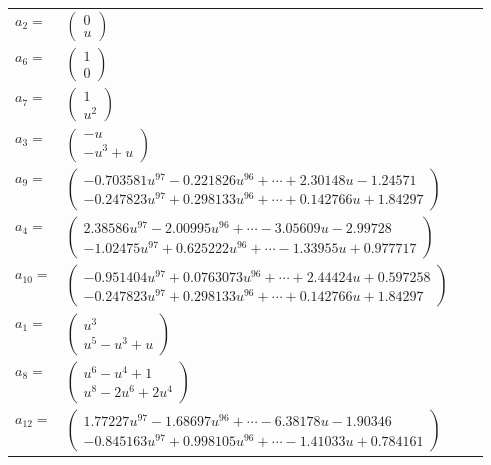 \documentclass[1p]{elsarticle_modified}
\theoremstyle{definition}
\begin{document}
\begin{tabular}{m{7pt} m{180pt} m{7pt} m{180pt} }
\flushright $a_{2}=$&$\begin{pmatrix}0\\u\end{pmatrix}$ \\
\flushright $a_{6}=$&$\begin{pmatrix}1\\0\end{pmatrix}$ \\
\flushright $a_{7}=$&$\begin{pmatrix}1\\u^2\end{pmatrix}$ \\
\flushright $a_{3}=$&$\begin{pmatrix}- u\\- u^3+u\end{pmatrix}$ \\
\flushright $a_{9}=$&$\begin{pmatrix}-0.703581 u^{97}-0.221826 u^{96}+\cdots+2.30148 u-1.24571\\-0.247823 u^{97}+0.298133 u^{96}+\cdots+0.142766 u+1.84297\end{pmatrix}$ \\
\flushright $a_{4}=$&$\begin{pmatrix}2.38586 u^{97}-2.00995 u^{96}+\cdots-3.05609 u-2.99728\\-1.02475 u^{97}+0.625222 u^{96}+\cdots-1.33955 u+0.977717\end{pmatrix}$ \\
\flushright $a_{10}=$&$\begin{pmatrix}-0.951404 u^{97}+0.0763073 u^{96}+\cdots+2.44424 u+0.597258\\-0.247823 u^{97}+0.298133 u^{96}+\cdots+0.142766 u+1.84297\end{pmatrix}$ \\
\flushright $a_{1}=$&$\begin{pmatrix}u^3\\u^5- u^3+u\end{pmatrix}$ \\
\flushright $a_{8}=$&$\begin{pmatrix}u^6- u^4+1\\u^8-2 u^6+2 u^4\end{pmatrix}$ \\
\flushright $a_{12}=$&$\begin{pmatrix}1.77227 u^{97}-1.68697 u^{96}+\cdots-6.38178 u-1.90346\\-0.845163 u^{97}+0.998105 u^{96}+\cdots-1.41033 u+0.784161\end{pmatrix}$ \\

\end{tabular}
\end{document}
